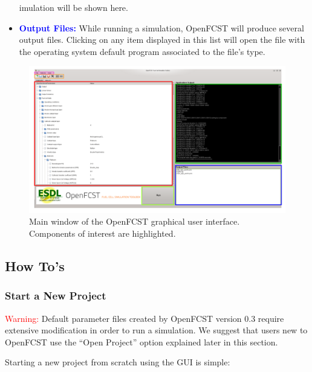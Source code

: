\begin{itemize}
imulation will be shown here.
 \item \textbf{\textcolor{blue}{Output Files:}} While running a simulation, OpenFCST will produce several output files. Clicking on any item displayed in this list will open the file with the operating system default program associated to the file's type. 
\end{itemize}

\begin{figure}[tbp]
\begin{center} 
\includegraphics[width=\textwidth]{./figures/gui3.png}
\caption{Main window of the OpenFCST graphical user interface. Components of interest are highlighted.}
\label{fig:GUI_overview}
\end{center}
\end{figure}

\subsection{How To's}
\subsubsection{Start a New Project} \label{sec:start_new_project_gui}
\textcolor{red}{Warning:} Default parameter files created by OpenFCST version 0.3 require extensive modification in order to run a simulation. We suggest that users new to OpenFCST use the ``Open Project'' option explained later in this section.

Starting a new project from scratch using the GUI is simple:

